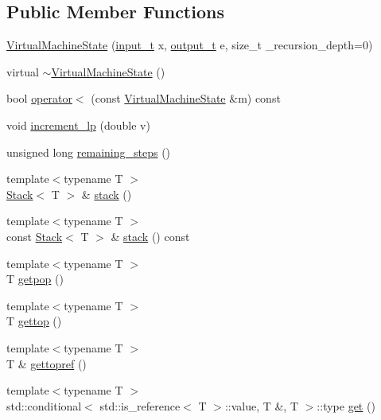 \subsection*{Public Member Functions}
\begin{DoxyCompactItemize}
\item 
\hyperlink{class_virtual_machine_state_a29c8e836431bb281d86215bf6f3e54d9}{Virtual\+Machine\+State} (\hyperlink{class_virtual_machine_state_a04c5592dddd5b9ffdae5a509d73127dd}{input\+\_\+t} x, \hyperlink{class_virtual_machine_state_a005a025f97d9505b00e7f9f0e99002bb}{output\+\_\+t} e, size\+\_\+t \+\_\+recursion\+\_\+depth=0)
\item 
virtual \hyperlink{class_virtual_machine_state_ac18b114e8adb2d8f218c5e6e7022ff2b}{$\sim$\+Virtual\+Machine\+State} ()
\item 
bool \hyperlink{class_virtual_machine_state_a213400a3e616f8d1a2041491ea4c782e}{operator$<$} (const \hyperlink{class_virtual_machine_state}{Virtual\+Machine\+State} \&m) const
\item 
void \hyperlink{class_virtual_machine_state_a160c5e22c2acd3997d0bb188ce296b2f}{increment\+\_\+lp} (double v)
\item 
unsigned long \hyperlink{class_virtual_machine_state_ae76dbfbf78879b1b0421720e635467a0}{remaining\+\_\+steps} ()
\item 
{\footnotesize template$<$typename T $>$ }\\\hyperlink{class_stack}{Stack}$<$ T $>$ \& \hyperlink{class_virtual_machine_state_aa44adbacc52d720bff01098c34275d0e}{stack} ()
\item 
{\footnotesize template$<$typename T $>$ }\\const \hyperlink{class_stack}{Stack}$<$ T $>$ \& \hyperlink{class_virtual_machine_state_ad238f813b3be9009e6bf0c63cf45b221}{stack} () const
\item 
{\footnotesize template$<$typename T $>$ }\\T \hyperlink{class_virtual_machine_state_a5c5373c434e10372d9e9a17df1532965}{getpop} ()
\item 
{\footnotesize template$<$typename T $>$ }\\T \hyperlink{class_virtual_machine_state_ac5a22fb0fbfa599bcb5e6a5961598815}{gettop} ()
\item 
{\footnotesize template$<$typename T $>$ }\\T \& \hyperlink{class_virtual_machine_state_a158edda7fbaf5e64b60f7723877cd608}{gettopref} ()
\item 
{\footnotesize template$<$typename T $>$ }\\std\+::conditional$<$ std\+::is\+\_\+reference$<$ T $>$\+::value, T \&, T $>$\+::type \hyperlink{class_virtual_machine_state_a28d07f08745840f202822f02dee947ed}{get} ()

\end{DoxyCompactItemize}
